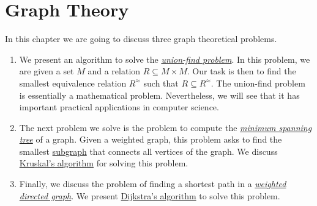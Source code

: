 \chapter{Graph Theory}
In this chapter we are going to discuss three graph theoretical problems.
\begin{enumerate}
\item We present an algorithm to solve the 
      \href{https://en.wikipedia.org/wiki/Disjoint-set_data_structure}{\emph{union-find problem}}.
      In this problem, we are given a set $M$ and a relation $R \subseteq M \times M$.  Our task is
      then to find the smallest equivalence relation $R^\approx$ such that $R \subseteq R^\approx$.  
      The union-find problem is essentially a mathematical problem.  Nevertheless, we will see that 
      it has important practical applications in computer science. 
\item The next problem we solve is the problem to compute the
      \href{https://en.wikipedia.org/wiki/Minimum_spanning_tree}{\emph{minimum spanning tree}}
      of a graph.  Given a weighted graph, this problem asks to find the smallest 
      \href{https://en.wikipedia.org/wiki/Glossary_of_graph_theory_terms#subgraph}{subgraph} that 
      connects all vertices of the graph.  We discuss
      \href{https://en.wikipedia.org/wiki/Kruskal%27s_algorithm}{Kruskal's algorithm} 
      for solving this problem.  
\item Finally, we discuss the problem of finding a shortest path in a 
      \href{https://en.wikipedia.org/wiki/Directed_graph}{\emph{weighted directed graph}}.
      We present \href{https://en.wikipedia.org/wiki/Dijkstra%27s_algorithm}{Dijkstra's algorithm} to solve
      this problem.   
\end{enumerate}

